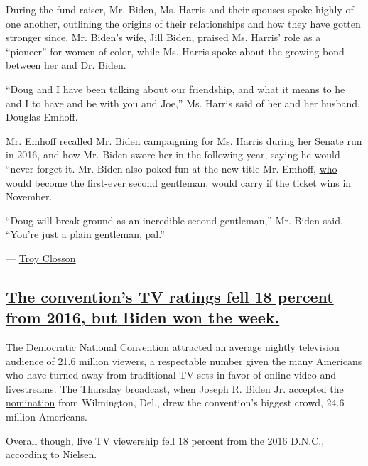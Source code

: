 During the fund-raiser, Mr. Biden, Ms. Harris and their spouses spoke
highly of one another, outlining the origins of their relationships and
how they have gotten stronger since. Mr. Biden's wife, Jill Biden,
praised Ms. Harris' role as a ``pioneer'' for women of color, while Ms.
Harris spoke about the growing bond between her and Dr. Biden.

``Doug and I have been talking about our friendship, and what it means
to he and I to have and be with you and Joe,'' Ms. Harris said of her
and her husband, Douglas Emhoff.

Mr. Emhoff recalled Mr. Biden campaigning for Ms. Harris during her
Senate run in 2016, and how Mr. Biden swore her in the following year,
saying he would ``never forget it. Mr. Biden also poked fun at the new
title Mr. Emhoff,
\href{https://www.nytimes3xbfgragh.onion/2020/08/19/us/politics/second-gentleman-doug-emhoff.html}{who
would become the first-ever second gentleman}, would carry if the ticket
wins in November.

``Doug will break ground as an incredible second gentleman,'' Mr. Biden
said. ``You're just a plain gentleman, pal.''

--- \href{https://www.nytimes3xbfgragh.onion/by/troy-closson}{Troy
Closson}

\hypertarget{the-conventions-tv-ratings-fell-18-percent-from-2016-but-biden-won-the-week}{%
\subsection{\texorpdfstring{\protect\hyperlink{the-conventions-tv-ratings-fell-18-percent-from-2016-but-biden-won-the-week}{The
convention's TV ratings fell 18 percent from 2016, but Biden won the
week.}}{The convention's TV ratings fell 18 percent from 2016, but Biden won the week.}}\label{the-conventions-tv-ratings-fell-18-percent-from-2016-but-biden-won-the-week}}

The Democratic National Convention attracted an average nightly
television audience of 21.6 million viewers, a respectable number given
the many Americans who have turned away from traditional TV sets in
favor of online video and livestreams. The Thursday broadcast,
\href{https://www.nytimes3xbfgragh.onion/2020/08/20/us/politics/joe-biden-2020.html}{when
Joseph R. Biden Jr. accepted the nomination} from Wilmington, Del., drew
the convention's biggest crowd, 24.6 million Americans.

Overall though, live TV viewership fell 18 percent from the 2016 D.N.C.,
according to Nielsen.

